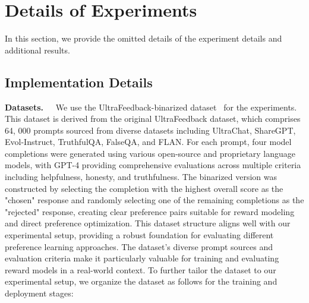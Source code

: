 \section{Details of Experiments}
\label{sec:detail_exp}

In this section, we provide the omitted details of the experiment details and additional results.

\subsection{Implementation Details}
\label{subsec:detail_exp:impl}
\noindent \textbf{Datasets.~~}
We use the UltraFeedback-binarized dataset~\citep{NeurIPS'23:DPO} for the experiments. This dataset is derived from the original UltraFeedback dataset, which comprises 64, 000 prompts sourced from diverse datasets including UltraChat, ShareGPT, Evol-Instruct, TruthfulQA, FalseQA, and FLAN. For each prompt, four model completions were generated using various open-source and proprietary language models, with GPT-4 providing comprehensive evaluations across multiple criteria including helpfulness, honesty, and truthfulness. The binarized version was constructed by selecting the completion with the highest overall score as the "chosen" response and randomly selecting one of the remaining completions as the "rejected" response, creating clear preference pairs suitable for reward modeling and direct preference optimization. This dataset structure aligns well with our experimental setup, providing a robust foundation for evaluating different preference learning approaches. The dataset's diverse prompt sources and evaluation criteria make it particularly valuable for training and evaluating reward models in a real-world context. To further tailor the dataset to our experimental setup, we organize the dataset as follows for the training and deployment stages:
